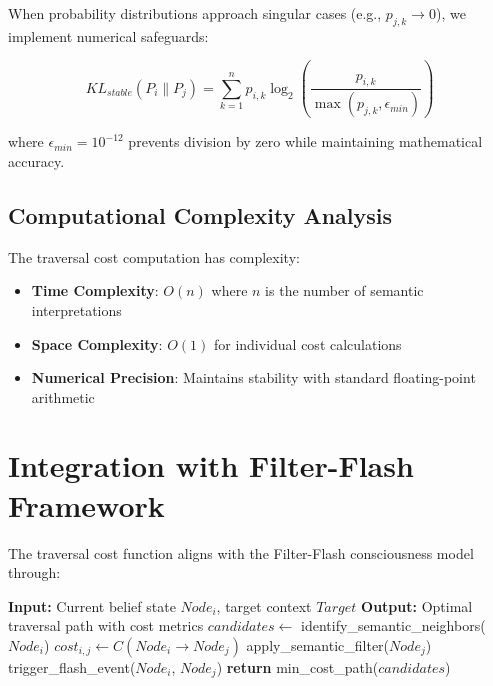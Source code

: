 \documentclass[11pt,a4paper]{article}
\begin{document}
When probability distributions approach singular cases (e.g., $p_{j,k} \rightarrow 0$), we implement numerical safeguards:

\begin{equation}
KL_{stable}(P_i \parallel P_j) = \sum_{k=1}^{n} p_{i,k} \log_2\left(\frac{p_{i,k}}{\max(p_{j,k}, \epsilon_{min})}\right)
\end{equation}

where $\epsilon_{min} = 10^{-12}$ prevents division by zero while maintaining mathematical accuracy.

\subsection{Computational Complexity Analysis}

The traversal cost computation has complexity:
\begin{itemize}
    \item \textbf{Time Complexity}: $O(n)$ where $n$ is the number of semantic interpretations
    \item \textbf{Space Complexity}: $O(1)$ for individual cost calculations
    \item \textbf{Numerical Precision}: Maintains stability with standard floating-point arithmetic
\end{itemize}

\section{Integration with Filter-Flash Framework}

The traversal cost function aligns with the Filter-Flash consciousness model through:

\begin{algorithm}
\caption{Filter-Flash Integrated Traversal}
\begin{algorithmic}
\STATE \textbf{Input:} Current belief state $Node_i$, target context $Target$
\STATE \textbf{Output:} Optimal traversal path with cost metrics
\STATE
\STATE $candidates \leftarrow$ identify\_semantic\_neighbors($Node_i$)
    \STATE $cost_{i,j} \leftarrow C(Node_i \rightarrow Node_j)$
        \STATE apply\_semantic\_filter($Node_j$)
    \ENDIF
        \STATE trigger\_flash\_event($Node_i$, $Node_j$)
    \ENDIF
\ENDFOR
\STATE \textbf{return} min\_cost\_path($candidates$)
\end{algorithmic}
\end{algorithm}
\end{document}
